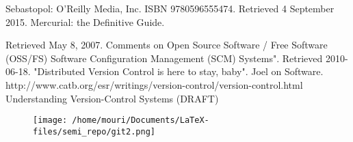 \documentclass[twoside]{article}
\begin{document}
\begin{multicols}{2}
\begin{thebibliography}{99}
Sebastopol: O'Reilly Media, Inc. ISBN 9780596555474. Retrieved 4 September 2015.
\newblock Mercurial: the Definitive Guide.
 
Retrieved May 8, 2007.
\newblock Comments on Open Source Software / Free Software (OSS/FS) Software Configuration Management (SCM) Systems".
Retrieved 2010-06-18.
\newblock "Distributed Version Control is here to stay, baby". Joel on Software.
http://www.catb.org/esr/writings/version-control/version-control.html\\
\newblock Understanding Version-Control Systems (DRAFT)
\end{thebibliography}

\begin{figure}[H]
\centering
\texttt{[image: /home/mouri/Documents/LaTeX-files/semi\_repo/git2.png]}
\end{figure}



\end{multicols}
\end{document}
